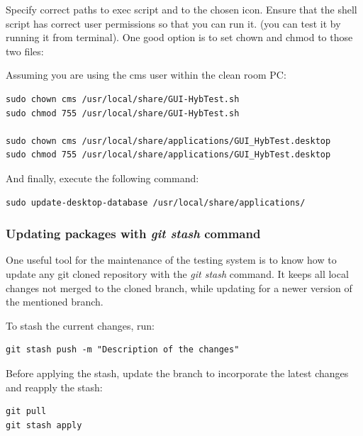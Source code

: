 \documentclass[10pt,a4paper]{article}
\begin{document}
Specify correct paths to exec script and to the chosen icon.
Ensure that the shell script has correct user permissions so that you can run it. (you can test it by running it from terminal). One good option is to set chown and chmod to those two files:

Assuming you are using the cms user within the clean room PC: 

\begin{framed}
\begin{verbatim}
sudo chown cms /usr/local/share/GUI-HybTest.sh
sudo chmod 755 /usr/local/share/GUI-HybTest.sh

sudo chown cms /usr/local/share/applications/GUI_HybTest.desktop
sudo chmod 755 /usr/local/share/applications/GUI_HybTest.desktop
\end{verbatim}
\end{framed}

And finally, execute the following command:
\begin{framed}
\begin{verbatim}
sudo update-desktop-database /usr/local/share/applications/
\end{verbatim}
\end{framed}

\subsubsection{Updating packages with \textit{git stash} command}

One useful tool for the maintenance of the testing system is to know how to update any git cloned repository with the \textit{git stash} command. It keeps all local changes not merged to the cloned branch, while updating for a newer version of the mentioned branch.

To stash the current changes, run:

\begin{framed}
\begin{verbatim}
git stash push -m "Description of the changes"
\end{verbatim}
\end{framed}

Before applying the stash, update the branch to incorporate the latest changes and reapply the stash:

\begin{framed}
\begin{verbatim}
git pull
git stash apply
\end{verbatim}
\end{framed}
\end{document}
